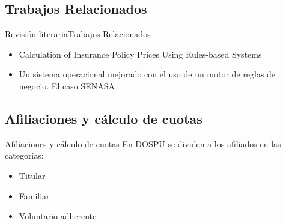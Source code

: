 \documentclass[10pt]{beamer}
\begin{document}
\subsection{Trabajos Relacionados}
\begin{frame}{Revisión literaria}{Trabajos Relacionados}
    \begin{itemize}
        \item Calculation of Insurance Policy Prices Using Rules-based Systems
        \item Un sistema operacional mejorado con el uso de un motor de reglas de negocio. El caso SENASA
    \end{itemize}
\end{frame}

\subsection{Afiliaciones y cálculo de cuotas}

\begin{frame}{Afiliaciones y cálculo de cuotas}
    En DOSPU se dividen a los afiliados en las categorías:
    \begin{itemize}
        \item Titular
        \item Familiar
        \item Voluntario adherente
    \end{itemize}
\end{frame}

\end{document}
